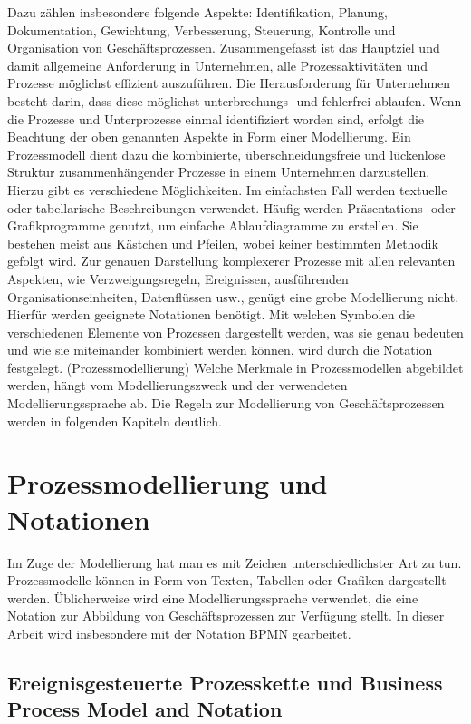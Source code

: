 Dazu zählen insbesondere folgende Aspekte:
Identifikation, Planung, Dokumentation,  Gewichtung, Verbesserung,
Steuerung, Kontrolle und Organisation von Geschäftsprozessen.
Zusammengefasst ist das Hauptziel und damit allgemeine Anforderung in Unternehmen, 
alle Prozessaktivitäten und Prozesse möglichst effizient auszuführen. 
Die Herausforderung für Unternehmen besteht darin, dass diese 
möglichst unterbrechungs- und fehlerfrei ablaufen. 
Wenn die Prozesse und Unterprozesse einmal identifiziert worden sind, 
erfolgt die Beachtung der oben genannten Aspekte in Form einer Modellierung. 
Ein Prozessmodell dient dazu die kombinierte, überschneidungsfreie 
und lückenlose Struktur zusammenhängender Prozesse in einem Unternehmen darzustellen. 
Hierzu gibt es verschiedene Möglichkeiten. 
Im einfachsten Fall werden textuelle oder tabellarische Beschreibungen verwendet. 
Häufig werden Präsentations- oder Grafikprogramme genutzt, um einfache Ablaufdiagramme 
zu erstellen. Sie bestehen meist aus Kästchen und Pfeilen, wobei keiner 
bestimmten Methodik gefolgt wird. Zur genauen Darstellung 
komplexerer Prozesse mit allen relevanten Aspekten, wie Verzweigungsregeln, 
Ereignissen, ausführenden Organisationseinheiten, Datenflüssen usw., 
genügt eine grobe Modellierung nicht. Hierfür werden geeignete Notationen benötigt. 
Mit welchen Symbolen die verschiedenen Elemente von Prozessen dargestellt werden, 
was sie genau bedeuten und wie sie miteinander kombiniert werden können, 
wird durch die Notation festgelegt. (Prozessmodellierung)
Welche Merkmale in Prozessmodellen abgebildet werden, hängt vom 
Modellierungszweck und der verwendeten Modellierungssprache ab. 
Die Regeln zur Modellierung von Geschäftsprozessen werden in folgenden Kapiteln deutlich.


\section{Prozessmodellierung und Notationen}

Im Zuge der Modellierung hat man es mit Zeichen unterschiedlichster Art zu tun.
Prozessmodelle können in Form von Texten, Tabellen oder Grafiken dargestellt werden. 
Üblicherweise wird eine Modellierungssprache verwendet, 
die eine Notation zur Abbildung von Geschäftsprozessen zur Verfügung stellt. 
In dieser Arbeit wird insbesondere mit der Notation BPMN gearbeitet.




\subsection{Ereignisgesteuerte Prozesskette und Business Process Model and
Notation}


